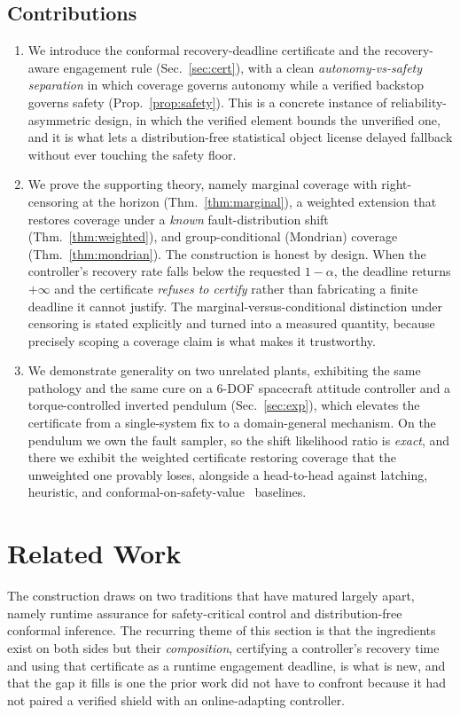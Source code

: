 \documentclass[journal]{IEEEtran}
\theoremstyle{plain}
\theoremstyle{definition}
\begin{document}
\subsection{Contributions}
\begin{enumerate}
\item We introduce the conformal recovery-deadline certificate and the recovery-aware
engagement rule (Sec.~\ref{sec:cert}), with a clean \emph{autonomy-vs-safety separation} in
which coverage governs autonomy while a verified backstop governs safety
(Prop.~\ref{prop:safety}). This is a concrete instance of reliability-asymmetric design, in
which the verified element bounds the unverified one, and it is what lets a distribution-free
statistical object license delayed fallback without ever touching the safety floor.
\item We prove the supporting theory, namely marginal coverage with right-censoring at the
horizon (Thm.~\ref{thm:marginal}), a weighted extension that restores coverage under a
\emph{known} fault-distribution shift (Thm.~\ref{thm:weighted}), and group-conditional
(Mondrian) coverage (Thm.~\ref{thm:mondrian}). The construction is honest by design. When the
controller's recovery rate falls below the requested $1-\alpha$, the deadline returns
$+\infty$ and the certificate \emph{refuses to certify} rather than fabricating a finite
deadline it cannot justify. The marginal-versus-conditional distinction under censoring is
stated explicitly and turned into a measured quantity, because precisely scoping a coverage
claim is what makes it trustworthy.
\item We demonstrate generality on two unrelated plants, exhibiting the same pathology and
the same cure on a 6-DOF spacecraft attitude controller and a torque-controlled inverted
pendulum (Sec.~\ref{sec:exp}), which elevates the certificate from a single-system fix to a
domain-general mechanism. On the pendulum we own the fault sampler, so the shift likelihood
ratio is \emph{exact}, and there we exhibit the weighted certificate restoring coverage that
the unweighted one provably loses, alongside a head-to-head against latching, heuristic, and
conformal-on-safety-value~\cite{Tabbara2025} baselines.
\end{enumerate}

\section{Related Work}
\label{sec:related}
The construction draws on two traditions that have matured largely apart, namely runtime
assurance for safety-critical control and distribution-free conformal inference. The
recurring theme of this section is that the ingredients exist on both sides but their
\emph{composition}, certifying a controller's recovery time and using that certificate as a
runtime engagement deadline, is what is new, and that the gap it fills is one the prior work
did not have to confront because it had not paired a verified shield with an online-adapting
controller.
\end{document}
